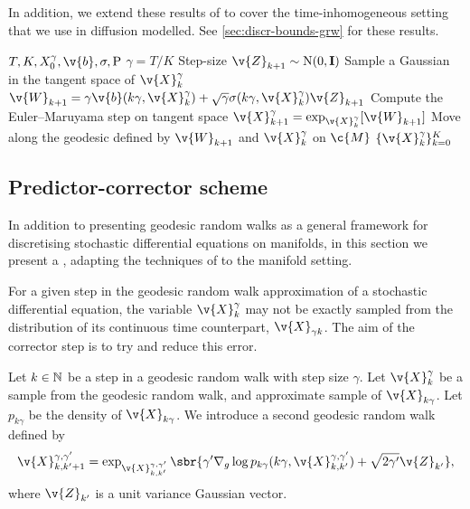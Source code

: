 In addition, we extend these results of \textcite{cheng2022theorymanifold} to cover the time-inhomogeneous setting that we use in diffusion modelled. See \cref{sec:discr-bounds-grw} for these results.

\begin{algorithm}[!t]
	\caption[]{}
	\label{alg:grw_rsgm}
	\begin{algorithmic}[1]
		\small
		\Require \(T, K, X_0^\gamma, \v{b}, \sigma, \mathrm{P}\)
		\State \(\gamma = T / K\) \Comment Step-size
		\State \(\v{Z}_{k+1} \sim \mathrm{N}(0, \m{I})\) \Comment Sample a Gaussian in the tangent space of \(\v{X}_k^\gamma\)
		\State \(\v{W}_{k+1} = \gamma \v{b}(k \gamma, \v{X}_{k}^\gamma) + \sqrt{\gamma} \sigma(k \gamma, \v{X}_{k}^\gamma) \v{Z}_{k+1}\) \Comment Compute the Euler--Maruyama step on tangent space
		\State \(\v{X}_{k+1}^\gamma = \exp_{\v{X}_{k}^\gamma}[\v{W}_{k+1}]\) \Comment Move along the geodesic defined by \(\v{W}_{k+1}\) and \(\v{X}_k^\gamma\) on \(\c{M}\)
		\EndFor
		 \(\{ \v{X}_{k}^\gamma\}_{k=0}^{K}\)
	\end{algorithmic}
\end{algorithm}

\subsection{Predictor-corrector scheme}
\label{sec:predictor-corrector}
In addition to presenting geodesic random walks as a general framework for discretising stochastic differential equations on manifolds, in this section we present a , adapting the techniques of \textcite{allgower2012numerical,song2020score} to the manifold setting.

For a given step in the geodesic random walk approximation of a stochastic differential equation, the variable \(\v{X}_{k}^\gamma\) may not be exactly sampled from the distribution of its continuous time counterpart, \(\v{X}_{\gamma k}\).
The aim of the corrector step is to try and reduce this error.

Let \(k\in \mathbb{N}\) be a step in a geodesic random walk with step size \(\gamma\).
Let \(\v{X}_k^\gamma\) be a sample from the geodesic random walk, and approximate sample of \(\v{X}_{k\gamma}\).
Let \(p_{k \gamma}\) be the density of \(\v{X}_{k \gamma}\).
We introduce a second geodesic random walk defined by 
\[
	\v{X}_{k, k'+1}^{\gamma, \gamma'} = \exp_{\v{X}_{k, k'}^{\gamma, \gamma'}}\sbr{\gamma' \nabla_g \log p_{k\gamma}(k\gamma, \v{X}_{k, k'}^{\gamma, \gamma'}) + \sqrt{2\gamma'} \v{Z}_{k'}},
\]
where \(\v{Z}_{k'}\) is a unit variance Gaussian vector.

